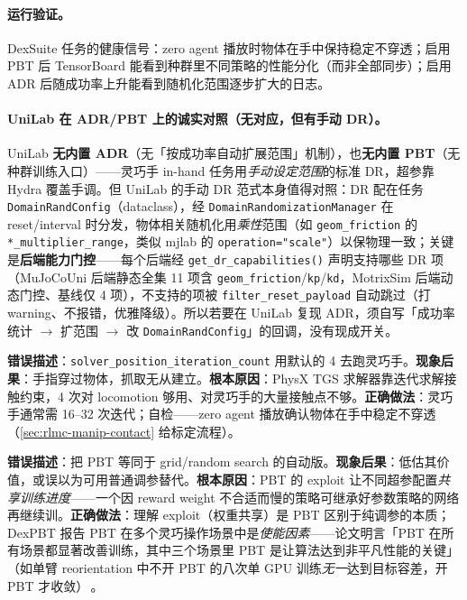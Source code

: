 \paragraph{运行验证。}DexSuite 任务的健康信号：zero agent 播放时物体在手中保持稳定不穿透；启用 PBT 后 TensorBoard 能看到种群里不同策略的性能分化（而非全部同步）；启用 ADR 后随成功率上升能看到随机化范围逐步扩大的日志。

\paragraph{UniLab 在 ADR/PBT 上的诚实对照（无对应，但有手动 DR）。}UniLab \textbf{无内置 ADR}（无「按成功率自动扩展范围」机制），也\textbf{无内置 PBT}（无种群训练入口）——灵巧手 in-hand 任务用\emph{手动设定范围}的标准 DR，超参靠 Hydra 覆盖手调。但 UniLab 的手动 DR 范式本身值得对照：DR 配在任务 \verb|DomainRandConfig|（dataclass），经 \verb|DomainRandomizationManager| 在 reset/interval 时分发，物体相关随机化用\emph{乘性}范围（如 \verb|geom_friction| 的 \verb|*_multiplier_range|，类似 mjlab 的 \verb|operation="scale"|）以保物理一致；关键是\textbf{后端能力门控}——每个后端经 \verb|get_dr_capabilities()| 声明支持哪些 DR 项（MuJoCoUni 后端静态全集 11 项含 \verb|geom_friction|/\verb|kp|/\verb|kd|，MotrixSim 后端动态门控、基线仅 4 项），不支持的项被 \verb|filter_reset_payload| 自动跳过（打 warning、不报错，优雅降级）。所以若要在 UniLab 复现 ADR，须自写「成功率统计 $\to$ 扩范围 $\to$ 改 \verb|DomainRandConfig|」的回调，没有现成开关。

\begin{pitfall}
\textbf{错误描述}：\verb|solver_position_iteration_count| 用默认的 4 去跑灵巧手。\textbf{现象后果}：手指穿过物体，抓取无从建立。\textbf{根本原因}：PhysX TGS 求解器靠迭代求解接触约束，4 次对 locomotion 够用、对灵巧手的大量接触点不够。\textbf{正确做法}：灵巧手通常需 16--32 次迭代；自检——zero agent 播放确认物体在手中稳定不穿透（\cref{sec:rlmc-manip-contact} 给标定流程）。
\end{pitfall}

\begin{pitfall}
\textbf{错误描述}：把 PBT 等同于 grid/random search 的自动版。\textbf{现象后果}：低估其价值，或误以为可用普通调参替代。\textbf{根本原因}：PBT 的 exploit 让不同超参配置\emph{共享训练进度}——一个因 reward weight 不合适而慢的策略可继承好参数策略的网络再继续训。\textbf{正确做法}：理解 exploit（权重共享）是 PBT 区别于纯调参的本质；DexPBT 报告 PBT 在多个灵巧操作场景中是\emph{使能因素}——论文明言「PBT 在所有场景都显著改善训练，其中三个场景里 PBT 是让算法达到非平凡性能的关键」（如单臂 reorientation 中不开 PBT 的八次单 GPU 训练\emph{无一}达到目标容差，开 PBT 才收敛）\,\cite{petrenko2023dexpbt}。
\end{pitfall}


